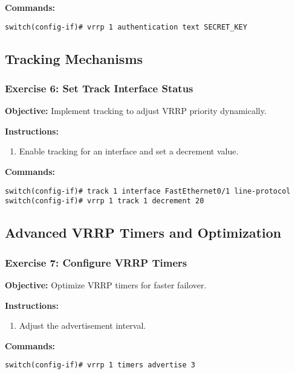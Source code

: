 \documentclass[12pt]{article}
\begin{document}
\textbf{Commands:}
\begin{lstlisting}[style=CiscoCLI]
switch(config-if)# vrrp 1 authentication text SECRET_KEY
\end{lstlisting}

\bigskip

\subsection{Tracking Mechanisms}

\subsubsection*{Exercise 6: Set Track Interface Status}
\textbf{Objective:} Implement tracking to adjust VRRP priority dynamically.

\textbf{Instructions:}
\begin{enumerate}
\item Enable tracking for an interface and set a decrement value.
\end{enumerate}

\textbf{Commands:}
\begin{lstlisting}[style=CiscoCLI]
switch(config-if)# track 1 interface FastEthernet0/1 line-protocol
switch(config-if)# vrrp 1 track 1 decrement 20
\end{lstlisting}

\bigskip

\subsection{Advanced VRRP Timers and Optimization}

\subsubsection*{Exercise 7: Configure VRRP Timers}
\textbf{Objective:} Optimize VRRP timers for faster failover.

\textbf{Instructions:}
\begin{enumerate}
\item Adjust the advertisement interval.
\end{enumerate}

\textbf{Commands:}
\begin{lstlisting}[style=CiscoCLI]
switch(config-if)# vrrp 1 timers advertise 3
\end{lstlisting}

\bigskip
\end{document}
